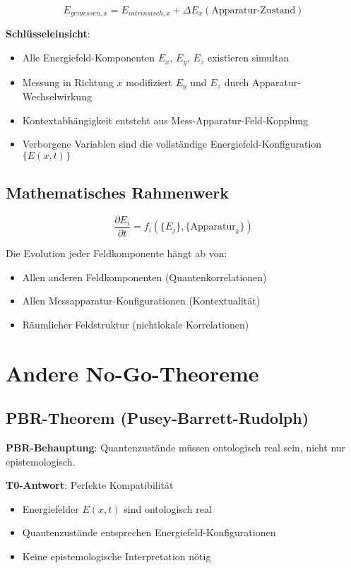 \documentclass[12pt,a4paper]{article}
\newcommand{\Efield}{E}
\begin{document}
	\begin{equation}
		\Efield_{gemessen,x} = \Efield_{intrinsisch,x} + \Delta\Efield_x(\text{Apparatur-Zustand})
	\end{equation}
	
	\textbf{Schlüsseleinsicht}: 
	\begin{itemize}
		\item Alle Energiefeld-Komponenten $\Efield_x$, $\Efield_y$, $\Efield_z$ existieren simultan
		\item Messung in Richtung $x$ modifiziert $\Efield_y$ und $\Efield_z$ durch Apparatur-Wechselwirkung
		\item Kontextabhängigkeit entsteht aus Mess-Apparatur-Feld-Kopplung
		\item Verborgene Variablen sind die vollständige Energiefeld-Konfiguration $\{\Efield(x,t)\}$
	\end{itemize}
	
	\subsection{Mathematisches Rahmenwerk}
	
	\begin{equation}
		\frac{\partial \Efield_i}{\partial t} = f_i(\{\Efield_j\}, \{\text{Apparatur}_k\})
	\end{equation}
	
	Die Evolution jeder Feldkomponente hängt ab von:
	\begin{itemize}
		\item Allen anderen Feldkomponenten (Quantenkorrelationen)
		\item Allen Messapparatur-Konfigurationen (Kontextualität)
		\item Räumlicher Feldstruktur (nichtlokale Korrelationen)
	\end{itemize}
	
	\section{Andere No-Go-Theoreme}
	
	\subsection{PBR-Theorem (Pusey-Barrett-Rudolph)}
	
	\textbf{PBR-Behauptung}: Quantenzustände müssen ontologisch real sein, nicht nur epistemologisch.
	
	\textbf{T0-Antwort}: Perfekte Kompatibilität
	\begin{itemize}
		\item Energiefelder $\Efield(x,t)$ sind ontologisch real
		\item Quantenzustände entsprechen Energiefeld-Konfigurationen
		\item Keine epistemologische Interpretation nötig
	\end{itemize}
	
\end{document}
